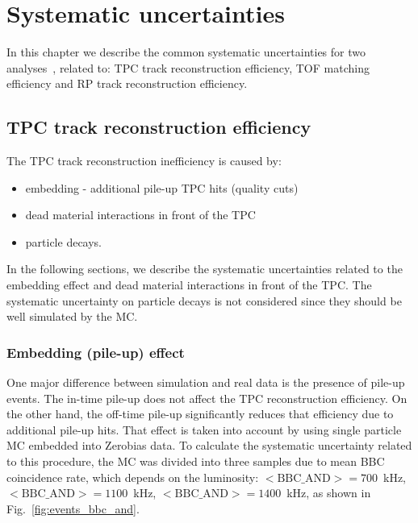 

\chapter{Systematic uncertainties}\label{chap:systematicErrors}
In this chapter we describe the common systematic uncertainties for two analyses~\cite{AnalysisNoteRafal,AnalysisNoteLukasz}, related to: TPC track reconstruction efficiency, TOF matching efficiency and RP track reconstruction efficiency.
\section{TPC track reconstruction efficiency}\label{sec:tpcSystematics}
The TPC track reconstruction inefficiency is caused by:
\begin{itemize}
	\item embedding  - additional pile-up TPC hits (quality cuts)
	\item dead material interactions in front of the TPC
	\item particle decays.
	
\end{itemize}
In the following sections, we describe the systematic uncertainties related to the embedding effect and dead material interactions in front of the TPC. The systematic uncertainty  on particle decays is not considered  since they should be well simulated by the MC.
\subsection{Embedding (pile-up) effect}\label{subsec:TpcEffSystPileUp}
One major difference between simulation and real data is the presence of pile-up
events. The in-time pile-up does not affect the TPC reconstruction efficiency. On the other hand, the off-time pile-up significantly reduces that efficiency due to additional pile-up hits. That effect is taken into account by using single particle MC embedded into Zerobias data. To calculate the systematic uncertainty related to this procedure, the MC  was divided into three samples due to mean BBC coincidence rate, which depends on the luminosity: \mbox{$<\text{BBC\_AND}>=700$~kHz}, \mbox{$<\text{BBC\_AND}>=1100$~kHz}, \mbox{$<\text{BBC\_AND}>=1400$~kHz}, as shown in Fig.~\ref{fig:events_bbc_and}.\vspace{-10pt}

